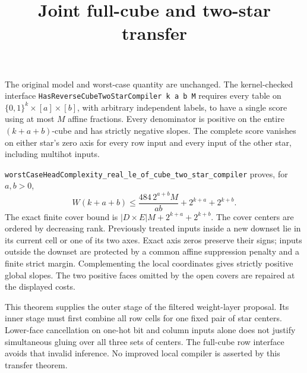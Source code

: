 \documentclass{article}
\begin{document}
\title{Joint full-cube and two-star transfer}
\maketitle
The original model and worst-case quantity are unchanged.  The kernel-checked
interface \texttt{HasReverseCubeTwoStarCompiler k a b M} requires every table
on $\{0,1\}^k\times[a]\times[b]$, with arbitrary independent labels, to have a
single score using at most $M$ affine fractions.  Every denominator is positive
on the entire $(k+a+b)$-cube and has strictly negative slopes.  The complete
score vanishes on either star's zero axis for every row input and every input
of the other star, including multihot inputs.

\texttt{worstCaseHeadComplexity\_real\_le\_of\_cube\_two\_star\_compiler}
proves, for $a,b>0$,
\[
 W(k+a+b)\leq \frac{484\,2^{a+b}M}{ab}+2^{k+a}+2^{k+b}.
\]
The exact finite cover bound is $|D\times E|M+2^{k+a}+2^{k+b}$.
The cover centers are ordered by decreasing rank.  Previously treated inputs
inside a new downset lie in its current cell or one of its two axes.  Exact
axis zeros preserve their signs; inputs outside the downset are protected by
a common affine suppression penalty and a finite strict margin.  Complementing
the local coordinates gives strictly positive global slopes.  The two positive
faces omitted by the open covers are repaired at the displayed costs.

This theorem supplies the outer stage of the filtered weight-layer proposal.
Its inner stage must first combine all row cells for one fixed pair of star
centers.  Lower-face cancellation on one-hot bit and column inputs alone does
not justify simultaneous gluing over all three sets of centers.  The full-cube
row interface avoids that invalid inference.  No improved local compiler is
asserted by this transfer theorem.
\end{document}
